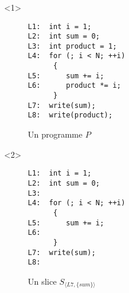 
\begin{frame}[fragile]
\frametitle{\subsecname}

\begin{onlyenv}<1>
\begin{figure}
\begin{lstlisting}
L1:  int i = 1;
L2:  int sum = 0;
L3:  int product = 1;
L4:  for (; i < N; ++i)
      {
L5:      sum += i;
L6:      product *= i;
      }
L7:  write(sum);
L8:  write(product);
\end{lstlisting}
\caption{Un programme $P$}
\end{figure}
\end{onlyenv}

\begin{onlyenv}<2>
\begin{figure}
\begin{lstlisting}
L1:  int i = 1;
L2:  int sum = 0;
L3:
L4:  for (; i < N; ++i)
      {
L5:      sum += i;
L6:
      }
L7:  write(sum);
L8:
\end{lstlisting}
\caption{Un slice $S_{\langle L7, \{sum\} \rangle}$}
\end{figure}
\end{onlyenv}
\end{frame}
